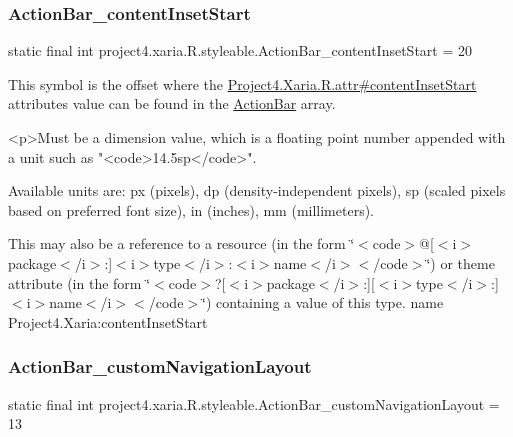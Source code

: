 \subsubsection{\texorpdfstring{Action\+Bar\+\_\+content\+Inset\+Start}{ActionBar\_contentInsetStart}}
{\footnotesize\ttfamily static final int project4.\+xaria.\+R.\+styleable.\+Action\+Bar\+\_\+content\+Inset\+Start = 20\hspace{0.3cm}{\ttfamily [static]}}

This symbol is the offset where the \hyperlink{}{Project4.\+Xaria.\+R.\+attr\#content\+Inset\+Start} attribute\textquotesingle{}s value can be found in the \hyperlink{classproject4_1_1xaria_1_1R_1_1styleable_accb530194c58ee3abb15587da8869e99}{Action\+Bar} array.

\begin{DoxyVerb}      <p>Must be a dimension value, which is a floating point number appended with a unit such as "<code>14.5sp</code>".
\end{DoxyVerb}
 Available units are\+: px (pixels), dp (density-\/independent pixels), sp (scaled pixels based on preferred font size), in (inches), mm (millimeters). 

This may also be a reference to a resource (in the form \char`\"{}$<$code$>$@\mbox{[}$<$i$>$package$<$/i$>$\+:\mbox{]}$<$i$>$type$<$/i$>$\+:$<$i$>$name$<$/i$>$$<$/code$>$\char`\"{}) or theme attribute (in the form \char`\"{}$<$code$>$?\mbox{[}$<$i$>$package$<$/i$>$\+:\mbox{]}\mbox{[}$<$i$>$type$<$/i$>$\+:\mbox{]}$<$i$>$name$<$/i$>$$<$/code$>$\char`\"{}) containing a value of this type.  name Project4.\+Xaria\+:content\+Inset\+Start \mbox{\label{classproject4_1_1xaria_1_1R_1_1styleable_aa80da3fcac263c12efd759fb11979cc7}} 
\subsubsection{\texorpdfstring{Action\+Bar\+\_\+custom\+Navigation\+Layout}{ActionBar\_customNavigationLayout}}
{\footnotesize\ttfamily static final int project4.\+xaria.\+R.\+styleable.\+Action\+Bar\+\_\+custom\+Navigation\+Layout = 13\hspace{0.3cm}{\ttfamily [static]}}

